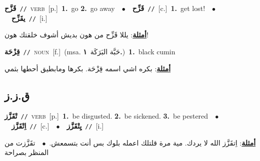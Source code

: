 \documentclass[10pt,a4paper,twoside]{article} %
\begin{document}
\begin{multicols}{2}
{\setlength\topsep{0pt}\textbf{\foreignlanguage{arabic}{قَزَّح}}\ {\color{gray}\texttt{//}\color{black}}\ \textsc{verb}\ [p.]\ \textbf{1.}~go  \textbf{2.}~go away\ \ $\bullet$\ \ \setlength\topsep{0pt}\textbf{\foreignlanguage{arabic}{قَزِّح}}\ {\color{gray}\texttt{//}\color{black}}\ [c.]\ \textbf{1.}~get lost!\ \ $\bullet$\ \ \setlength\topsep{0pt}\textbf{\foreignlanguage{arabic}{يقَزِّح}}\ {\color{gray}\texttt{//}\color{black}}\ [i.]\  \begin{flushright}\color{gray}\foreignlanguage{arabic}{\textbf{\underline{\foreignlanguage{arabic}{أمثلة}}}: يللا قَزِّح من هون بديش أشوف خلقتك هون!}\end{flushright}\color{black}} \vspace{2mm}

{\setlength\topsep{0pt}\textbf{\foreignlanguage{arabic}{قِزْحَة}}\ {\color{gray}\texttt{//}\color{black}}\ \textsc{noun}\ [f.]\ \color{gray}(msa. \foreignlanguage{arabic}{حَبَّة البَرَكَة}~\foreignlanguage{arabic}{\textbf{١.}})\color{black}\ \textbf{1.}~black cumin\  \begin{flushright}\color{gray}\foreignlanguage{arabic}{\textbf{\underline{\foreignlanguage{arabic}{أمثلة}}}: بكره اشي اسمه قِزْحَة. بكرها ومابطيق أحطها بثمي}\end{flushright}\color{black}} \vspace{2mm}

\vspace{-3mm}
\subsection*{\color{blue}\foreignlanguage{arabic}{ق.ز.ز}\color{blue}{}} 

{\setlength\topsep{0pt}\textbf{\foreignlanguage{arabic}{تْقَزَّز}}\ {\color{gray}\texttt{//}\color{black}}\ \textsc{verb}\ [p.]\ \textbf{1.}~be disgusted.  \textbf{2.}~be sickened.  \textbf{3.}~be pestered\ \ $\bullet$\ \ \setlength\topsep{0pt}\textbf{\foreignlanguage{arabic}{اِتْقَزَّز}}\ {\color{gray}\texttt{//}\color{black}}\ [c.]\ \ $\bullet$\ \ \setlength\topsep{0pt}\textbf{\foreignlanguage{arabic}{يِتْقَزَّز}}\ {\color{gray}\texttt{//}\color{black}}\ [i.]\  \begin{flushright}\color{gray}\foreignlanguage{arabic}{\textbf{\underline{\foreignlanguage{arabic}{أمثلة}}}: اِتقَزَّز الله لا يردك. مية مرة قلتلك اعمله بلوك بس أنت بتسمعش.\ $\bullet$\ \  تقَزَّزت من المنظر بصراحة}\end{flushright}\color{black}} \vspace{2mm}


\end{multicols}
\end{document}
